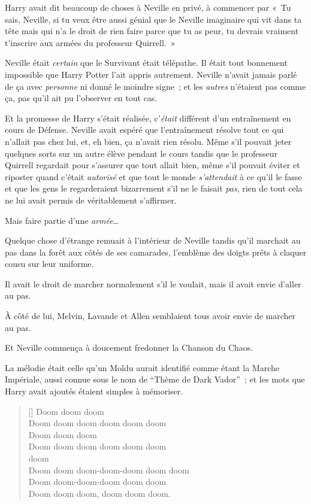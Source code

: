 Harry avait dit beaucoup de choses à Neville en privé, à commencer par «~Tu sais, Neville, si tu veux être aussi génial que le Neville imaginaire qui vit dans ta tête mais qui n'a le droit de rien faire parce que tu as peur, tu devrais vraiment t'inscrire aux armées du professeur Quirrell.~»

Neville était \emph{certain} que le Survivant était télépathe.
Il était tout bonnement impossible que Harry Potter l'ait appris autrement.
Neville n'avait jamais parlé de ça avec \emph{personne} ni donné le moindre signe~; et les \emph{autres} n'étaient pas comme ça, pas qu'il ait pu l'observer en tout cas.

Et la promesse de Harry s'était réalisée, c'\emph{était} différent d'un entraînement en cours de Défense.
Neville avait espéré que l'entraînement résolve tout ce qui n'allait pas chez lui, et, eh bien, ça n'avait rien résolu.
Même s'il pouvait jeter quelques sorts sur un autre élève pendant le cours tandis que le professeur Quirrell regardait pour s'assurer que tout allait bien, même s'il pouvait éviter et riposter quand c'était \emph{autorisé} et que tout le monde \emph{s'attendait} à ce qu'il le fasse et que les gens le regarderaient bizarrement s'il ne le faisait \emph{pas}, rien de tout cela ne lui avait permis de véritablement s'affirmer.

Mais faire partie d'une \emph{armée}…

Quelque chose d'étrange remuait à l'intérieur de Neville tandis qu'il marchait au pas dans la forêt aux côtés de ses camarades, l'emblème des doigts prêts à claquer cousu sur leur uniforme.

Il avait le droit de marcher normalement s'il le voulait, mais il avait envie d'aller au pas.

À côté de lui, Melvin, Lavande et Allen semblaient tous avoir envie de marcher au pas.

Et Neville commença à doucement fredonner la Chanson du Chaos.

La mélodie était celle qu'un Moldu aurait identifié comme étant la Marche Impériale, aussi connue sous le nom de “Thème de Dark Vador”~; et les mots que Harry avait ajoutés étaient simples à mémoriser.
\baselineskip\settowidth{\versewidth}{Doom doom doom-doom-doom doom doom} \begin{verse}[\versewidth] Doom doom doom\\ Doom doom doom doom doom doom\\ Doom doom doom\\ Doom doom doom doom doom doom\\  doom \\ Doom doom doom-doom-doom doom doom\\ Doom doom-doom-doom doom doom\\ Doom doom doom, doom doom doom.
\end{verse}\baselineskip

